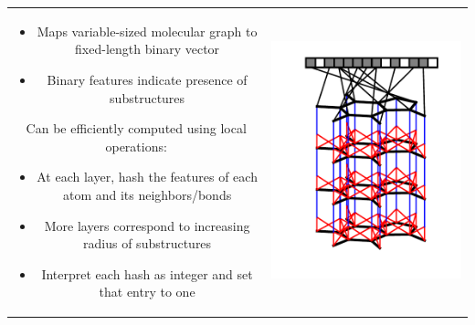\documentclass[landscape,a0b,final,a4resizeable]{include/a0poster}
\begin{document}
\begin{poster}
\begin{multicols}{3}


\vspace{0.5in}

\begin{tabular}{cc}
\begin{minipage}[c]{0.5\columnwidth}
\begin{itemize}
  \item Maps variable-sized molecular graph to fixed-length binary vector
  \item Binary features indicate presence of substructures
\end{itemize}

\vspace{0.5in}

Can be efficiently computed using local operations:

\begin{itemize}
  \item At each layer, hash the features of each atom and its neighbors/bonds
  \item More layers correspond to increasing radius of substructures
  \item Interpret each hash as integer and set that entry to one
\end{itemize}
\end{minipage} & 
\begin{minipage}[c]{0.5\columnwidth}
\centerline{\includegraphics[width=0.9\columnwidth, clip, trim=4mm 12mm 4mm 4mm]{figures/fig_1}}
\end{minipage}
\end{tabular}


\end{multicols}
\end{poster}
\end{document}
